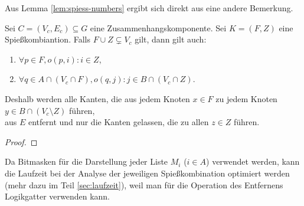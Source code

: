 Aus Lemma \ref{lem:spiess-numbers} ergibt sich direkt aus eine andere Bemerkung.

\begin{lemma}\label{lem:komponente-mengen}
Sei $C = (V_c, E_c) \subseteq G$ eine Zusammenhangskomponente.
Sei $K = (F, Z)$ eine Spießkombiantion.
Falls $F \cup Z \subsetneq V_c$ gilt, dann gilt auch:
\begin{enumerate}[label={\upshape(\roman*)}]
  \item $\forall p \in F, o(p, i): i \in Z$,
  \item $\forall q \in A \cap (V_c \cap F), o(q, j): j \in B \cap (V_c \cap Z)$.
\end{enumerate}
Deshalb werden alle Kanten, die aus jedem Knoten $x \in F$ 
zu jedem Knoten $y \in B \cap (V_c \setminus Z)$ führen,\\ aus $E$ entfernt und nur die Kanten gelassen, die
zu allen $z \in Z$ führen.
\end{lemma}

\begin{proof}
\end{proof}

 
Da Bitmasken für die Darstellung jeder Liste $M_i$ ($i \in A$) verwendet werden, kann
die Laufzeit bei der Analyse der jeweiligen Spießkombination optimiert werden
(mehr dazu im Teil \ref{sec:laufzeit}),
weil man für die Operation des Entfernens Logikgatter verwenden kann.
